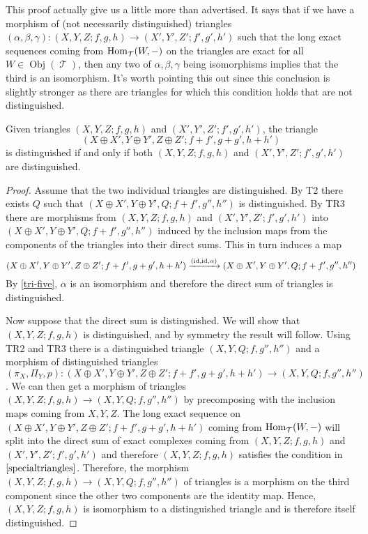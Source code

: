 \documentclass[11pt]{article}
\DeclareMathOperator{\ob}{Obj}
\DeclareMathOperator{\TT}{\mathcal{T}}
\begin{document}
\begin{rmk}\label{specialtriangles}
This proof actually give us a little more than advertised. It says that if we have a morphism of (not necessarily distinguished) triangles $(\alpha,\beta,\gamma): (X,Y,Z; f,g,h) \to (X',Y',Z'; f',g',h')$ such that the long exact sequences coming from $\Hom_{\TT}(W,-)$ on the triangles are exact for all $W \in \ob(\TT)$, then any two of $\alpha,\beta,\gamma$ being isomorphisms implies that the third is an isomorphism. It's worth pointing this out since this conclusion is slightly stronger as there are triangles for which this condition holds that are not distinguished.
\end{rmk}

\begin{cor}\label{sumoftriangles}
	Given triangles $(X,Y,Z; f,g,h)$ and $(X',Y',Z'; f',g',h')$, the triangle
	\[
		(X \oplus X', Y \oplus Y', Z \oplus Z'; f+f', g+g', h+h')
	\]
	is distinguished if and only if both $(X,Y,Z; f,g,h)$ and $(X',Y',Z'; f',g',h')$ are distinguished.
\end{cor}
\begin{proof}
Assume that the two individual triangles are distinguished. By T2 there exists $Q$ such that $(X \oplus X', Y \oplus Y', Q; f+f', g'', h'')$ is distinguished. By TR3 there are morphisms from $(X,Y,Z; f,g,h)$ and $(X',Y',Z'; f',g',h')$ into $(X \oplus X', Y \oplus Y', Q; f+f', g'', h'')$ induced by the inclusion maps from the components of the triangles into their direct sums. This in turn induces a map 
\[
	(X \oplus X', Y \oplus Y', Z \oplus Z'; f+f', g+g', h+h') \xrightarrow{(\operatorname{id},\operatorname{id},\alpha)}(X \oplus X', Y \oplus Y', Q; f+f', g'', h'')
\]
By \autoref{tri-five}, $\alpha$ is an isomorphism and therefore the direct sum of triangles is distinguished.

Now suppose that the direct sum is distinguished. We will show that $(X,Y,Z; f,g,h)$ is distinguished, and by symmetry the result will follow. Using TR2 and TR3 there is a distinguished triangle $(X,Y,Q; f,g'',h'')$ and a morphism of distinguished triangles $(\pi_X,\Pi_Y, p): (X \oplus X', Y \oplus Y', Z \oplus Z'; f+f', g+g', h+h') \to (X,Y,Q; f,g'',h'')$. We can then get a morphism of triangles $(X,Y,Z; f,g,h) \to (X,Y,Q; f,g'',h'')$ by precomposing with the inclusion maps coming from $X,Y,Z$. The long exact sequence on $(X \oplus X', Y \oplus Y', Z \oplus Z'; f+f', g+g', h+h')$ coming from $\Hom_{\TT}(W,-)$ will split into the direct sum of exact complexes coming from $(X,Y,Z; f,g,h)$ and $(X',Y',Z'; f',g',h')$ and therefore $(X,Y,Z; f,g,h)$ satisfies the condition in $\autoref{specialtriangles}$. Therefore, the morphism $(X,Y,Z; f,g,h) \to (X,Y,Q; f,g'',h'')$ of triangles is a morphism on the third component since the other two components are the identity map. Hence, $(X,Y,Z; f,g,h)$ is isomorphism to a distinguished triangle and is therefore itself distinguished.
\end{proof}
\end{document}
